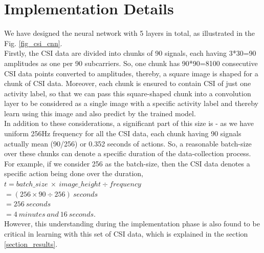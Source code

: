 \documentclass[conference]{IEEEtran}
\begin{document}
\section{Implementation Details}
We have designed the neural network with 5 layers in total, as illustrated in the Fig. \ref{fig_csi_cnn}.\\
Firstly, the CSI data are divided into chunks of 90 signals, each having 3*30=90 amplitudes as one per 90 subcarriers. So, one chunk has 90*90=8100 consecutive CSI data points converted to amplitudes, thereby, a square image is shaped for a chunk of CSI data. Moreover, each chunk is ensured to contain CSI of just one activity label, so that we can pass this square-shaped chunk into a convolution layer to be considered as a single image with a specific activity label and thereby learn using this image and also predict by the trained model.\\
In addition to these considerations, a significant part of this size is - as we have uniform 256Hz frequency for all the CSI data, each chunk having 90 signals actually mean (90/256) or 0.352 seconds of actions. So, a reasonable batch-size over these chunks can denote a specific duration of the data-collection process. For example, if we consider 256 as the batch-size, then the CSI data denotes a specific action being done over the duration, \\
$t = batch\_size\ \times\ image\_height \div frequency$ \\
$=(256 \times 90 \div 256)\ seconds$ \\
$= 256\ seconds$ \\
$= 4\ minutes\ and\ 16\ seconds.$\\

However, this understanding during the implementation phase is also found to be critical in learning with this set of CSI data, which is explained in the section \ref{section_results}.
\end{document}
